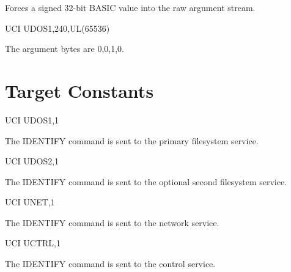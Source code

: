 \begin{referencechapter}

Forces a signed 32-bit BASIC value into the raw argument stream.

\begin{screen}
UCI UDOS1,240,UL(65536)
\end{screen}

\begin{resultbox}
The argument bytes are 0,0,1,0.
\end{resultbox}

\section{Target Constants}

\begin{screen}
UCI UDOS1,1
\end{screen}
\begin{resultbox}
The IDENTIFY command is sent to the primary filesystem service.
\end{resultbox}

\begin{screen}
UCI UDOS2,1
\end{screen}
\begin{resultbox}
The IDENTIFY command is sent to the optional second filesystem service.
\end{resultbox}

\begin{screen}
UCI UNET,1
\end{screen}
\begin{resultbox}
The IDENTIFY command is sent to the network service.
\end{resultbox}

\begin{screen}
UCI UCTRL,1
\end{screen}
\begin{resultbox}
The IDENTIFY command is sent to the control service.
\end{resultbox}


\end{referencechapter}
